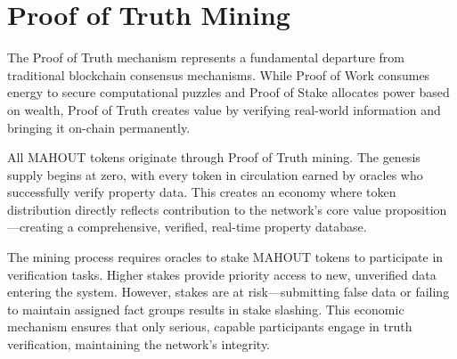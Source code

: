 \section{Proof of Truth Mining}

The Proof of Truth mechanism represents a fundamental departure from traditional blockchain consensus mechanisms. While Proof of Work consumes energy to secure computational puzzles and Proof of Stake allocates power based on wealth, Proof of Truth creates value by verifying real-world information and bringing it on-chain permanently.

All MAHOUT tokens originate through Proof of Truth mining. The genesis supply begins at zero, with every token in circulation earned by oracles who successfully verify property data. This creates an economy where token distribution directly reflects contribution to the network's core value proposition—creating a comprehensive, verified, real-time property database.

The mining process requires oracles to stake MAHOUT tokens to participate in verification tasks. Higher stakes provide priority access to new, unverified data entering the system. However, stakes are at risk—submitting false data or failing to maintain assigned fact groups results in stake slashing. This economic mechanism ensures that only serious, capable participants engage in truth verification, maintaining the network's integrity.

